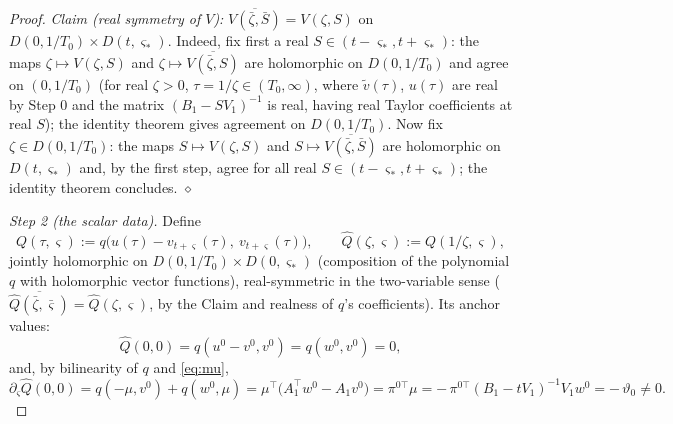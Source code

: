 \documentclass[11pt]{article}
\theoremstyle{definition}
\theoremstyle{remark}
\theoremstyle{plain}
\begin{document}
\begin{proof}
\emph{Claim (real symmetry of $V$): }
$\overline{V(\bar\zeta,\bar S)}=V(\zeta,S)$ on $D(0,1/T_0)\times D(t,\varsigma_*)$.
Indeed, fix first a real $S\in(t-\varsigma_*,t+\varsigma_*)$: the maps
$\zeta\mapsto V(\zeta,S)$ and $\zeta\mapsto\overline{V(\bar\zeta,S)}$ are holomorphic
on $D(0,1/T_0)$ and agree on $(0,1/T_0)$ (for real $\zeta>0$, $\tau=1/\zeta\in
(T_0,\infty)$, where $\widetilde v(\tau)$, $u(\tau)$ are real by Step 0 and the matrix
$(B_1-SV_1)^{-1}$ is real, having real Taylor coefficients at real $S$); the identity
theorem gives agreement on $D(0,1/T_0)$.  Now fix $\zeta\in D(0,1/T_0)$: the maps
$S\mapsto V(\zeta,S)$ and $S\mapsto\overline{V(\bar\zeta,\bar S)}$ are holomorphic on
$D(t,\varsigma_*)$ and, by the first step, agree for all real
$S\in(t-\varsigma_*,t+\varsigma_*)$; the identity theorem concludes.
\hfill$\diamond$

\emph{Step 2 (the scalar data).}  Define
\[
Q(\tau,\varsigma):=q\big(u(\tau)-v_{t+\varsigma}(\tau),\ v_{t+\varsigma}(\tau)\big),
\qquad
\widehat Q(\zeta,\varsigma):=Q(1/\zeta,\varsigma),
\]
jointly holomorphic on $D(0,1/T_0)\times D(0,\varsigma_*)$ (composition of the
polynomial $q$ with holomorphic vector functions), real-symmetric in the two-variable
sense ($\overline{\widehat Q(\bar\zeta,\bar\varsigma)}=\widehat Q(\zeta,\varsigma)$, by
the Claim and realness of $q$'s coefficients).  Its anchor values:
\[
\widehat Q(0,0)=q(u^0-v^0,v^0)=q(w^0,v^0)=0,
\]
and, by bilinearity of $q$ and \eqref{eq:mu},
\[
\partial_\varsigma\widehat Q(0,0)=q(-\mu,v^0)+q(w^0,\mu)
=\mu^\top\big(A_1^\top w^0-A_1v^0\big)
=\pi^{0\top}\mu=-\,\pi^{0\top}(B_1-tV_1)^{-1}V_1w^0=-\,\vartheta_0\neq0 .
\]


\end{proof}
\end{document}
